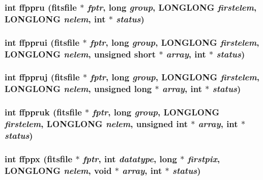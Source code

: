 \subsubsection{\setlength{\rightskip}{0pt plus 5cm}int ffppru (\bf{fitsfile} $\ast$ {\em fptr}, long {\em group}, \bf{LONGLONG} {\em firstelem}, \bf{LONGLONG} {\em nelem}, int $\ast$ {\em status})}\label{fitsio__64_8h_02bd28787c00e22132867eab898e1632}


\subsubsection{\setlength{\rightskip}{0pt plus 5cm}int ffpprui (\bf{fitsfile} $\ast$ {\em fptr}, long {\em group}, \bf{LONGLONG} {\em firstelem}, \bf{LONGLONG} {\em nelem}, unsigned short $\ast$ {\em array}, int $\ast$ {\em status})}\label{fitsio__64_8h_bf984c3beeeb97131a4237a5ff8fb344}


\subsubsection{\setlength{\rightskip}{0pt plus 5cm}int ffppruj (\bf{fitsfile} $\ast$ {\em fptr}, long {\em group}, \bf{LONGLONG} {\em firstelem}, \bf{LONGLONG} {\em nelem}, unsigned long $\ast$ {\em array}, int $\ast$ {\em status})}\label{fitsio__64_8h_4a659ff524a1a425fda4b2063373f848}


\subsubsection{\setlength{\rightskip}{0pt plus 5cm}int ffppruk (\bf{fitsfile} $\ast$ {\em fptr}, long {\em group}, \bf{LONGLONG} {\em firstelem}, \bf{LONGLONG} {\em nelem}, unsigned int $\ast$ {\em array}, int $\ast$ {\em status})}\label{fitsio__64_8h_380316a0418b53a2e545f283279a3eff}


\subsubsection{\setlength{\rightskip}{0pt plus 5cm}int ffppx (\bf{fitsfile} $\ast$ {\em fptr}, int {\em datatype}, long $\ast$ {\em firstpix}, \bf{LONGLONG} {\em nelem}, void $\ast$ {\em array}, int $\ast$ {\em status})}\label{fitsio__64_8h_9a545226811c5df0f85e0bd4c98f0f95}


